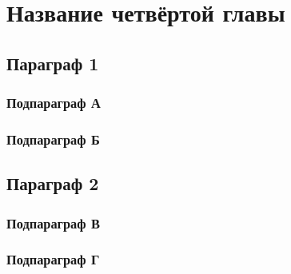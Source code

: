 \section{Название четвёртой главы}

\subsection{Параграф 1}

\subsubsection{Подпараграф А}
\subsubsection{Подпараграф Б}


\subsection{Параграф 2}

\subsubsection{Подпараграф В}
\subsubsection{Подпараграф Г}